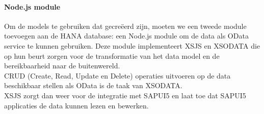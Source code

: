             \paragraph{Node.js module}
            Om de models te gebruiken dat gecreëerd zijn, moeten we een tweede module toevoegen aan de HANA database: een Node.js module om de data als OData service te kunnen gebruiken.
            Deze module implementeert XSJS en XSODATA die op hun beurt zorgen voor de transformatie van het data model en de bereikbaarheid naar de buitenwereld.\\
            CRUD (Create, Read, Update en Delete) operaties uitvoeren op de data beschikbaar stellen als OData is de taak van XSODATA.\\
            XSJS zorgt dan weer voor de integratie met SAPUI5 en laat toe dat SAPUI5 applicaties de data kunnen lezen en bewerken.
